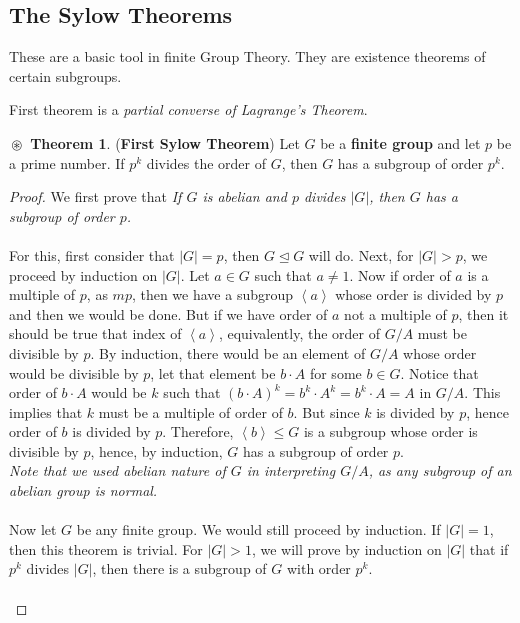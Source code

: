 \documentclass{article}
\theoremstyle{definition}
\newtheorem{theorem}{$\boxed{\boxed{\circledast}}$ Theorem}
\theoremstyle{remark}
\theoremstyle{definition}
\theoremstyle{definition}
\theoremstyle{definition}
\theoremstyle{proof}
\newcommand{\gen}[1]{\left\langle #1\right\rangle}
\newcommand{\order}[1]{\left\vert #1 \right\vert}
\newcommand{\nsg}[0]{\trianglelefteq}
\begin{document}
\subsection{The Sylow Theorems}
These are a basic tool in finite Group Theory. They are existence theorems of certain subgroups.

\hrulefill

First theorem is a \emph{partial converse of Lagrange's Theorem}.
\begin{theorem}
	(\textbf{First Sylow Theorem}) Let $ G $ be a \textbf{finite group} and let $ p $ be a prime number. If $ p^k $ divides the order of $ G $, then $ G $ has a subgroup of order $ p^k $.
\end{theorem}
\begin{proof}
We first prove that \emph{If $ G $ is abelian and $ p $ divides $ \order{G} $, then $ G $ has a subgroup of order $ p $.}\\\\
For this, first consider that $ \order{G} = p$, then $ G \nsg G$ will do. Next, for $ \order{G}>p $, we proceed by induction on $ \order{G} $. Let $ a\in G $ such that $ a\neq 1 $. Now if order of $ a $ is a multiple of $ p $, as $ mp $, then we have a subgroup $ \gen{a} $ whose order is divided by $ p $ and then we would be done. But if we have order of $ a $ not a multiple of $ p $, then it should be true that index of $ \gen{a} $, equivalently, the order of $ G/A $ must be divisible by $ p $. By induction, there would be an element of $ G/A $ whose order would be divisible by $ p $, let that element be $ b\cdot A $ for some $ b\in G $. Notice that order of $ b\cdot A $ would be $ k $ such that $ (b\cdot A)^k = b^k \cdot A^k= b^k \cdot A= A $ in $ G/A $. This implies that $ k $ must be a multiple of order of $ b $. But since $ k $ is divided by $ p $, hence order of $ b $ is divided by $ p $. Therefore, $ \gen{b}\le G $ is a subgroup whose order is divisible by $ p $, hence, by induction, $ G $ has a subgroup of order $ p $.\\
\emph{Note that we used abelian nature of $ G $ in interpreting $ G/A $, as any subgroup of an abelian group is normal.}\\\\
Now let $ G $ be any finite group. We would still proceed by induction. If $ \order{G} = 1$, then this theorem is trivial. For $ \order{G}>1 $, we will prove by induction on $ \order{G} $ that if $ p^k $ divides $ \order{G} $, then there is a subgroup of $ G $ with order $ p^k $.\\\\

\end{proof}
\end{document}
